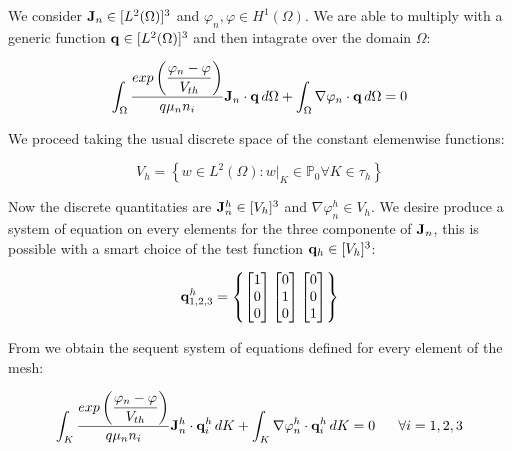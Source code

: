 We consider $\mathbf{J}_n\in[L^2(\Omega)]^3$ and $\varphi_n,\varphi \in H^1(\Omega)$. We are able to multiply  with a generic function $\mathbf{q}\in[L^2(\Omega)]^3$ and then intagrate over the domain $\Omega$:

\begin{equation}
\label{eq: variation form of current density continuos}
\int_\Omega \dfrac{ exp \left( \dfrac{\varphi_n-\varphi}{V_{th}} \right) }{q \mu_n n_i} \mathbf{J}_n \cdot \mathbf{q} \, d\Omega
 + \int_\Omega \nabla \varphi_n \cdot \mathbf{q} \, d\Omega = 0 
\end{equation}


We proceed taking the usual discrete space of the constant elemenwise functions:

\begin{equation}
\label{eq: spaces elementwise constant}
V_h=\left\{ w \in L^2(\Omega) : w|_{K}\in \mathbb{P}_0 \forall K \in \tau_h\right\}
\end{equation}

Now the discrete quantitaties are $\mathbf{J}_n^h\in[V_h]^3$ and $\nabla \varphi_n^h \in V_h$. We desire produce a system of equation on every elements for the three componente of $\mathbf{J}_n$, this is possible with a smart choice of the test function $\mathbf{q}_h \in [V_h]^3$:

\begin{equation}
\label{eq: form of qh}
\mathbf{q}^h_{1,2,3} = \left\{ \begin{bmatrix} 1 \\ 0 \\ 0 \end{bmatrix}  \begin{bmatrix} 0 \\ 1 \\ 0 \end{bmatrix}  \begin{bmatrix} 0 \\ 0 \\ 1 \end{bmatrix}  \right\}
\end{equation}

From  we obtain the sequent system of equations defined for every element of the mesh:

\begin{equation}
\label{eq: variation form of current density}
\int_K \dfrac{ exp \left( \dfrac{\varphi_n-\varphi}{V_{th}} \right) }{q \mu_n n_i} \vect{J}_n^h \cdot \vect{q}^h_i \, dK
 + \int_K \nabla \varphi_n^h \cdot \vect{q}^h_i \, dK = 0 \psp{10} \forall i=1,2,3
\end{equation}

